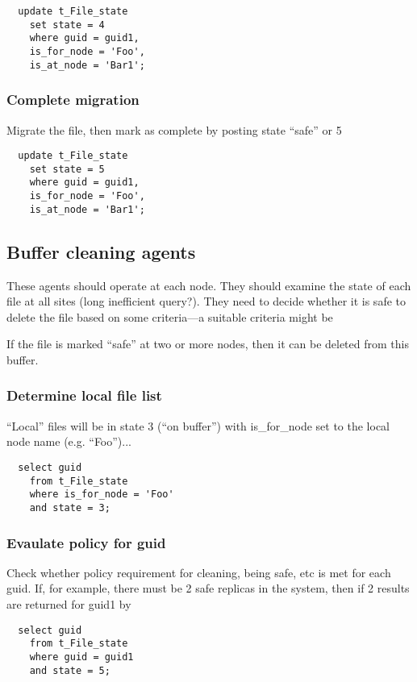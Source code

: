 \documentclass{cmspaper}
\begin{document}
{\small\begin{verbatim}
  update t_File_state
    set state = 4
    where guid = guid1,
    is_for_node = 'Foo',
    is_at_node = 'Bar1';
\end{verbatim}}

\subsubsection{Complete migration}
Migrate the file, then mark as complete by posting state ``safe'' or 5

{\small\begin{verbatim}
  update t_File_state
    set state = 5
    where guid = guid1,
    is_for_node = 'Foo',
    is_at_node = 'Bar1';
\end{verbatim}}


\subsection{Buffer cleaning agents}

These agents should operate at each node. They should examine the
state of each file at all sites (long inefficient query?). They need
to decide whether it is safe to delete the file based on some
criteria---a suitable criteria might be

If the file is marked ``safe'' at two or more nodes, then it can be
deleted from this buffer.

\subsubsection{Determine local file list}
``Local'' files will be in state 3 (``on buffer'') with is\_for\_node set to the local node name (e.g. ``Foo'')...

{\small\begin{verbatim}
  select guid
  	from t_File_state
  	where is_for_node = 'Foo'
  	and state = 3;
\end{verbatim}}

\subsubsection{Evaulate policy for guid}
Check whether policy requirement for cleaning, being safe, etc is met for each guid. If, for example, there must be 2 safe replicas in the system, then if 2 results are returned for guid1 by

{\small\begin{verbatim}
  select guid
  	from t_File_state
  	where guid = guid1
  	and state = 5;
\end{verbatim}}
\end{document}

